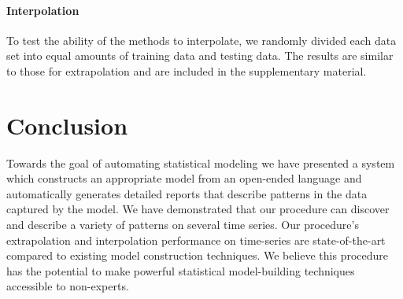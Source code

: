 \documentclass[letterpaper]{article}
\begin{document}
\paragraph{Interpolation}
To test the ability of the methods to interpolate, we randomly divided each data set into equal amounts of training data and testing data.
The results are similar to those for extrapolation and are included in the supplementary material.

\section{Conclusion}

Towards the goal of automating statistical modeling we have presented a system which constructs an appropriate model from an open-ended language and automatically generates detailed reports that describe patterns in the data captured by the model.
We have demonstrated that our procedure can discover and describe a variety of patterns on several time series.
Our procedure's extrapolation and interpolation performance on time-series are state-of-the-art compared to existing model construction techniques.
We believe this procedure has the potential to make powerful statistical model-building techniques accessible to non-experts.



\end{document}
